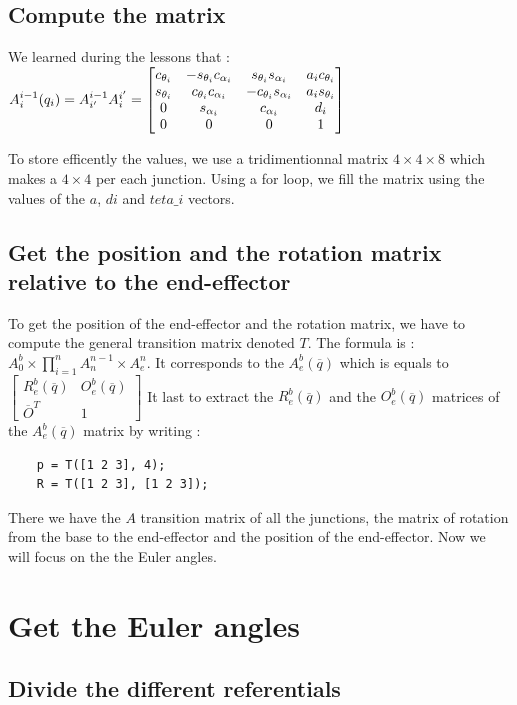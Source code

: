 \documentclass[english,a4paper,11pt]{report}
\begin{document}
	
	\subsection{Compute the matrix}
	We learned during the lessons that :
	$A^{i-1}_{i}(q_{i}) = A^{i-1}_{i\rq{}}A^{i\rq{}}_{i} = 
	\begin{bmatrix} 
	c_{\theta_{i}} & - s_{\theta_{i}} c_{\alpha_{i}} & s_{\theta_{i}} s_{\alpha_{i}} & a_{i} c_{\theta_{i}}\\
	s_{\theta_{i}} &  c_{\theta_{i}} c_{\alpha_{i}} & -c_{\theta_{i}} s_{\alpha_{i}} & a_{i} s_{\theta_{i}}\\
	0 &  s_{\alpha_{i}}  & c_{\alpha_{i}} & d_{i}\\
	0 & 0 & 0 & 1
	\end{bmatrix} $

	To store efficently the values, we use a tridimentionnal matrix $4\times4\times8$ which makes a $4\times4$ per each junction. Using a for loop, we fill the matrix using the values of the $a$, $di$ and $teta\_i$ vectors.
	
	\subsection{Get the position and the rotation matrix relative to the end-effector}
	
	To get the position of the end-effector and the rotation matrix, we have to compute the general transition matrix denoted $T$. The formula is : $A^b_0\times\prod_{i=1}^n A^{n-1}_n\times A^n_e$.
	It corresponds to the $A^b_e(\overline{q})$ which is equals to 
	$\begin{bmatrix} 
	R^b_e(\overline{q}) & O^b_e(\overline{q})\\
	\overline{O}^T & 1
	\end{bmatrix} $
	It last to extract the $R^b_e(\overline{q})$ and the $O^b_e(\overline{q})$ matrices of the $A^b_e(\overline{q})$ matrix by writing :
	\begin{lstlisting}
	p = T([1 2 3], 4);
	R = T([1 2 3], [1 2 3]);
	 \end{lstlisting}
	 
	 There we have the $A$ transition matrix of all the junctions, the matrix of rotation from the base to the end-effector and the position of the end-effector. Now we will focus on the the Euler angles.
	 
	 
	 \section{Get the Euler angles}
	\subsection{Divide the different referentials}
	
	\newpage

	\listoffigures
	
\end{document}
